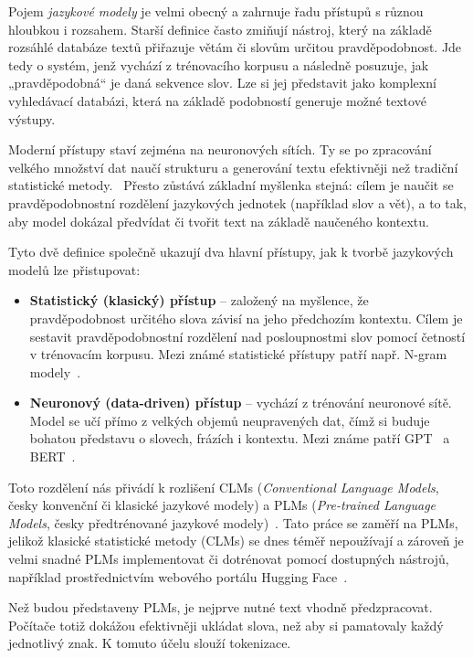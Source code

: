 Pojem \emph{jazykové modely} je velmi obecný a zahrnuje řadu přístupů s různou hloubkou i rozsahem. Starší definice často zmiňují nástroj, který na základě rozsáhlé databáze textů přiřazuje větám či slovům určitou pravděpodobnost. Jde tedy o systém, jenž vychází z trénovacího korpusu a následně posuzuje, jak „pravděpodobná“ je daná sekvence slov. Lze si jej představit jako komplexní vyhledávací databázi, která na základě podobností generuje možné textové výstupy.~\cite{Hiemstra2009}

Moderní přístupy staví zejména na neuronových sítích. Ty se po zpracování velkého množství dat naučí strukturu a generování textu efektivněji než tradiční statistické metody.~\cite{Wei_2024} Přesto zůstává základní myšlenka stejná: cílem je naučit se pravděpodobnostní rozdělení jazykových jednotek (například slov a vět), a to tak, aby model dokázal předvídat či tvořit text na základě naučeného kontextu.

Tyto dvě definice společně ukazují dva hlavní přístupy, jak k tvorbě jazykových modelů lze přistupovat:~\cite{Wei_2024, zhou2023comprehensivesurveypretrainedfoundation}

\begin{itemize}
    \item \textbf{Statistický (klasický) přístup} -- založený na myšlence, že pravděpodobnost určitého slova závisí na jeho předchozím kontextu. Cílem je sestavit pravděpodobnostní rozdělení nad posloupnostmi slov pomocí četností v trénovacím korpusu. Mezi známé statistické přístupy patří např. N-gram modely~\cite{brown-etal-1992-class}.
    \item \textbf{Neuronový (data-driven) přístup} -- vychází z trénování neuronové sítě. Model se učí přímo z velkých objemů neupravených dat, čímž si buduje bohatou představu o slovech, frázích i kontextu. Mezi známe patří GPT~\cite{radford2018improving} a BERT~\cite{devlin2019bert}.
\end{itemize}

Toto rozdělení nás přivádí k rozlišení CLMs (\emph{Conventional Language Models}, česky konvenční či klasické jazykové modely) a PLMs (\emph{Pre-trained Language Models}, česky předtrénované jazykové modely)~\cite{Wei_2024}. Tato práce se zaměří na PLMs, jelikož klasické statistické metody (CLMs) se dnes téměř nepoužívají a zároveň je velmi snadné PLMs implementovat či dotrénovat pomocí dostupných nástrojů, například prostřednictvím webového portálu Hugging Face~\cite{huggingface}.

Než budou představeny PLMs, je nejprve nutné text vhodně předzpracovat. Počítače totiž dokážou efektivněji ukládat slova, než aby si pamatovaly každý jednotlivý znak. K tomuto účelu slouží tokenizace.

